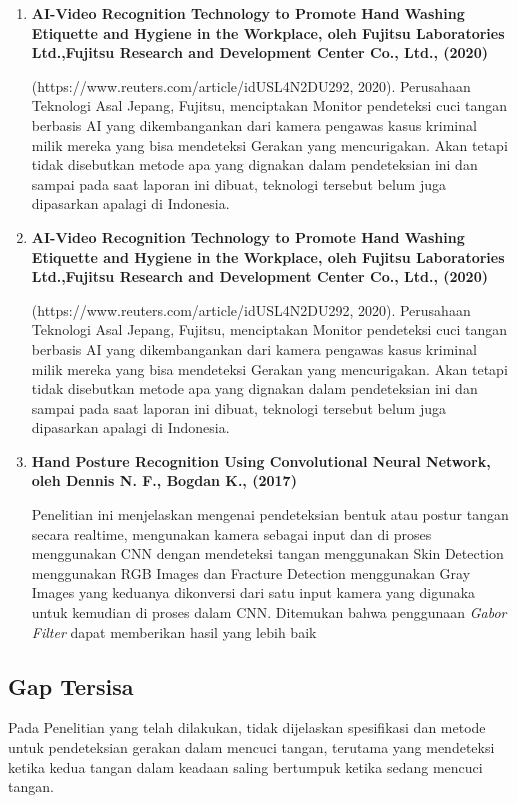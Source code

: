 \documentclass[a4paper]{article}
\begin{document}
			\begin{enumerate}
				\item \textbf {AI-Video Recognition Technology to Promote Hand Washing Etiquette and Hygiene in the Workplace, oleh Fujitsu Laboratories Ltd.,Fujitsu Research and Development Center Co., Ltd., (2020)}
				
				(https://www.reuters.com/article/idUSL4N2DU292, 2020). Perusahaan Teknologi Asal Jepang, Fujitsu, menciptakan Monitor pendeteksi cuci tangan berbasis AI yang dikembangankan dari kamera pengawas kasus kriminal milik mereka yang bisa mendeteksi Gerakan yang mencurigakan. Akan tetapi tidak disebutkan metode apa yang dignakan dalam pendeteksian ini dan sampai pada saat laporan ini dibuat, teknologi tersebut belum juga dipasarkan apalagi di Indonesia.
				
				\item \textbf{AI-Video Recognition Technology to Promote Hand Washing Etiquette and Hygiene in the Workplace, oleh Fujitsu Laboratories Ltd.,Fujitsu Research and Development Center Co., Ltd., (2020)}
				
				(https://www.reuters.com/article/idUSL4N2DU292, 2020). Perusahaan Teknologi Asal Jepang, Fujitsu, menciptakan Monitor pendeteksi cuci tangan berbasis AI yang dikembangankan dari kamera pengawas kasus kriminal milik mereka yang bisa mendeteksi Gerakan yang mencurigakan. Akan tetapi tidak disebutkan metode apa yang dignakan dalam pendeteksian ini dan sampai pada saat laporan ini dibuat, teknologi tersebut belum juga dipasarkan apalagi di Indonesia.
				
				\item \textbf{Hand Posture Recognition Using Convolutional Neural Network, oleh Dennis N. F., Bogdan K., (2017)}
				
				Penelitian ini menjelaskan mengenai pendeteksian bentuk atau postur tangan secara realtime, mengunakan kamera sebagai input dan di proses menggunakan CNN dengan mendeteksi  tangan menggunakan Skin Detection menggunakan RGB Images dan Fracture Detection menggunakan Gray Images yang keduanya dikonversi dari satu input kamera yang digunaka untuk kemudian di proses dalam CNN. Ditemukan bahwa penggunaan \textit{Gabor Filter} dapat memberikan hasil yang lebih baik
			\end{enumerate}

		\subsection{Gap Tersisa}
			\hspace{11mm}Pada Penelitian yang telah dilakukan, tidak dijelaskan spesifikasi dan metode untuk pendeteksian gerakan dalam mencuci tangan, terutama yang mendeteksi ketika kedua tangan dalam keadaan saling bertumpuk ketika sedang mencuci tangan.
\end{document}
